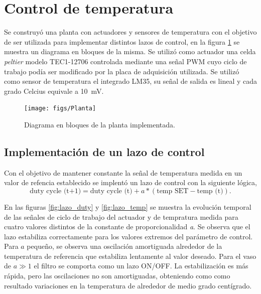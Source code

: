 \documentclass[a4paper,11pt]{article}
\begin{document}
\clearpage
\section{Control de temperatura}
\label{sec:control_temperatura}

Se construyó una planta con actuadores y sensores de temperatura con el
objetivo de ser utilizada para implementar distintos lazos de control,
en la figura \ref{fig:planta} se muestra un diagrama en bloques de la
misma.  Se utilizó como actuador una celda \emph{peltier} modelo
TEC1-12706 controlada mediante una señal PWM cuyo ciclo de trabajo podía
ser modificado por la placa de adquisición utilizada. Se utilizó como
sensor de temperatura el integrado LM35, su señal de salida es lineal y
cada grado Celcius equivale a \SI{10}{\mV}. 

\begin{figure}[!ht]
\centering
\texttt{[image: figs/Planta]}
\caption{Diagrama en bloques de la planta implementada.}
\label{fig:planta}
\end{figure}

\subsection{Implementación de un lazo de control}
Con el objetivo de mantener constante la
señal de temperatura medida en un valor de refencia establecido se
implentó un lazo de control con la siguiente lógica,
\begin{equation*}
\text{duty cycle (t+1)} = \text{duty cycle (t)} + a * (\text{temp SET}
- \text{temp (t)}).
\end{equation*}

En las figuras \ref{fig:lazo_duty} y \ref{fig:lazo_temp} se muestra la
evolución temporal de las señales de ciclo de trabajo del actuador y de
tempratura medida para cuatro valores distintos de la constante de
proporcionalidad \emph{a}. Se observa que el lazo estabiliza correctamente para los valores extremos del parámetro de control. Para $a$ pequeño, se observa una oscilación amortiguada alrededor de la temperatura de referencia que estabiliza lentamente al valor deseado. Para el vaso de $a \gg 1$ el filtro se comporta como un lazo ON/OFF. La estabilización es más rápida, pero las oscilaciones no son amortiguadas, obteniendo como como resultado variaciones en la temperatura de alrededor de medio grado centígrado.
\end{document}
